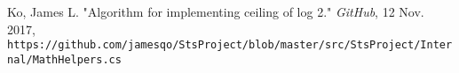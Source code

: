 \begin{thebibliography}{9}

	Ko, James L. "Algorithm for implementing ceiling of log 2." \textit{GitHub}, 12 Nov. 2017,\\ \texttt{https://github.com/jamesqo/StsProject/blob/master/src/StsProject/Internal/MathHelpers.cs}
\end{thebibliography}